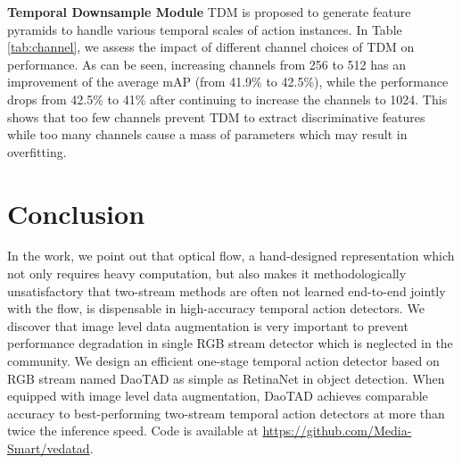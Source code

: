\documentclass[final]{cvpr}
\begin{document}
\textbf{Temporal Downsample Module}
TDM is proposed to generate feature pyramids to handle various temporal scales of action instances. In Table \ref{tab:channel}, we assess the impact of different channel choices of TDM on performance. As can be seen, increasing channels from 256 to 512 has an improvement of the average mAP (from 41.9\% to 42.5\%), while the performance drops from 42.5\% to 41\% after continuing to increase the channels to 1024. This shows that too few channels prevent TDM to extract discriminative features while too many channels cause a mass of parameters which may result in overfitting.

\section{Conclusion}
In the work, we point out that optical flow, a hand-designed representation which not only requires heavy computation, but also makes it methodologically unsatisfactory that two-stream methods are often not learned end-to-end jointly with the flow, is dispensable in high-accuracy temporal action detectors. We discover that image level data augmentation is very important to prevent performance degradation in single RGB stream detector which is neglected in the community. We design an efficient one-stage temporal action detector based on RGB stream named DaoTAD as simple as RetinaNet in object detection. When equipped with image level data augmentation, DaoTAD achieves comparable accuracy to best-performing two-stream temporal action detectors at more than twice the inference speed. Code is available at \url{https://github.com/Media-Smart/vedatad}.
{\small


}
\end{document}

